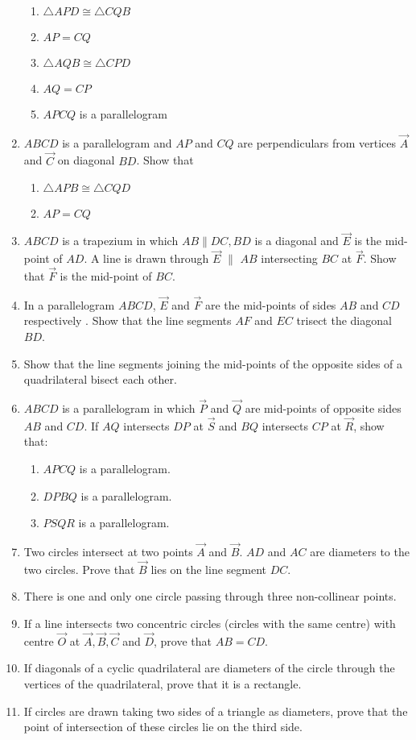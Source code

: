 \begin{enumerate}[label=\thesubsection.\arabic*.,ref=\thesubsection.\theenumi]
\begin{enumerate}
 \item  $\triangle  APD  \cong   \triangle  CQB$ 
\item $AP = CQ$ \item  $\triangle  AQB  \cong   \triangle  CPD$ 
\item $AQ = CP$ 
\item $APCQ$ is a parallelogram
\end{enumerate}
\item $ABCD$ is a parallelogram and $AP$ and $CQ$ are perpendiculars from vertices $\vec{A}$ and $\vec{C}$ on diagonal $BD$. Show that 
\begin{enumerate} 
\item  $\triangle  APB  \cong   \triangle  CQD $ 
\item $AP = CQ$
\end{enumerate}
\item $ABCD$ is a trapezium in which $AB  \parallel  DC, BD$ is a diagonal and $\vec{E}$ is the mid-point of $AD$. A line is drawn through $\vec{E}$ $\parallel$  $AB$ intersecting $BC$ at $\vec{F}$. Show that $\vec{F}$ is the mid-point of $BC$.
\item In a parallelogram $ABCD$, $\vec{E}$ and $\vec{F}$ are the mid-points of sides $AB$ and $CD$ respectively . Show that the line segments $AF$ and $EC$ trisect the diagonal $BD$.
\item Show that the line segments joining the mid-points of the opposite sides of a quadrilateral bisect each other.
\item $ABCD$ is a parallelogram in which $\vec{P}$ and $\vec{Q}$ are mid-points of opposite sides $AB$ and $CD$. If $AQ$ intersects $DP$ at $\vec{S}$ and $BQ$ intersects $CP$ at $\vec{R}$, show that: 
%
\begin{enumerate}
\item  $APCQ$ is a parallelogram. 
\item $DPBQ$ is a parallelogram. 
\item $PSQR$ is a parallelogram.
\end{enumerate}
%
\item Two circles intersect at two points $\vec{A}$ and $\vec{B}$. $AD$ and $AC$ are diameters to the two circles. Prove that $\vec{B}$ lies on the line segment $DC$.
\item  There is one and only one circle passing through three non-collinear points. 
\item If a line intersects two concentric circles (circles with the same centre) with centre $\vec{O}$ at $\vec{A}, \vec{B}, \vec{C}$ and $\vec{D}$, prove that $AB = CD$.
\item If diagonals of a cyclic quadrilateral are diameters of the circle through the vertices of
the quadrilateral, prove that it is a rectangle.
\item If circles are drawn taking two sides of a triangle as diameters, prove that the point of
intersection of these circles lie on the third side.
\end{enumerate}

